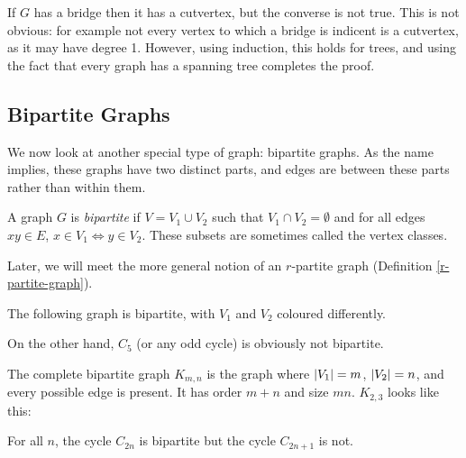 \documentclass{article}
\begin{document}
\begin{note}
	If $G$ has a bridge then it has a cutvertex, but the converse is not true. This is not obvious: for example not every vertex to which a bridge is indicent is a cutvertex, as it may have degree 1. However, using induction, this holds for trees, and using the fact that every graph has a spanning tree completes the proof.
\end{note}


\subsection{Bipartite Graphs}

We now look at another special type of graph: bipartite graphs. As the name implies, these graphs have two distinct parts, and edges are between these parts rather than within them.

\begin{definition}
	\label{bipartite-definition}
	A graph $G$ is \textit{bipartite} if $V = V_1 \cup V_2$ such that $V_1 \cap V_2 = \emptyset$ and for all edges $xy \in E$, $x \in V_1 \iff y \in V_2$. These subsets are sometimes called the vertex classes.
\end{definition}

\begin{note}
	Later, we will meet the more general notion of an $r$-partite graph (Definition \ref{r-partite-graph}).
\end{note}

\begin{example}
    The following graph is bipartite, with $V_1$ and $V_2$ coloured differently.
    
    
    On the other hand, $C_5$ (or any odd cycle) is obviously not bipartite.

    The complete bipartite graph $K_{m,n}$ is the graph where $\left\lvert V_1 \right\rvert = m$, $\left\lvert V_2 \right\rvert = n$, and every possible edge is present. It has order $m + n$ and size $mn$. $K_{2,3}$ looks like this:
    
\end{example}

\begin{proposition}
	For all $n$, the cycle $C_{2n}$ is bipartite but the cycle $C_{2n+1}$ is not.
\end{proposition}
\end{document}

